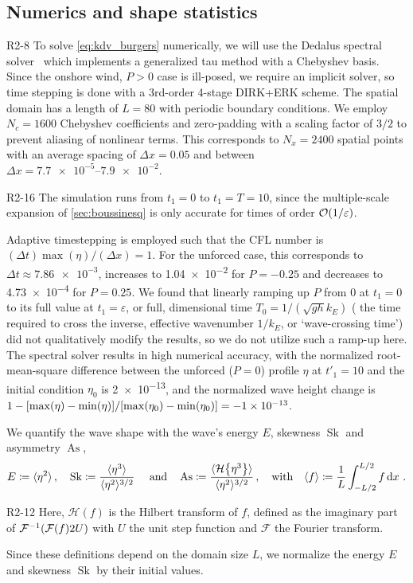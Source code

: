 \documentclass{jfm}
\DeclareMathOperator{\Sk}{Sk}
\DeclareMathOperator{\As}{As}
\newcommand{\fourier}{\mathcal{F}}
\newcommand{\hilbert}{\mathcal{H}}
\renewcommand*{\epsilon}{\varepsilon}
\begin{document}
\subsection{\label{sec:numerics} Numerics and shape statistics}
\begin{LineLabel}{R2-8}
To solve \cref{eq:kdv_burgers} numerically, we will use the Dedalus
spectral solver~\citep{burns2020dedalus} which implements a generalized
tau method with a Chebyshev basis.
Since the onshore wind, $P>0$ case is ill-posed, we require an implicit
solver, so time stepping is done with a 3rd-order 4-stage DIRK+ERK
scheme.
The spatial domain has a length of $L=80$ with periodic boundary
conditions.
We employ $N_c = 1600$ Chebyshev coefficients and zero-padding with a
scaling factor of $3/2$ to prevent aliasing of nonlinear terms.
This corresponds to $N_x = 2400$ spatial points with an average spacing
of $\Delta x = 0.05$ and between $\Delta x = \numrange{7.7e-5}{7.9e-2}$.
\begin{LineLabel}{R2-16}
The simulation runs from $t_1 = 0$ to $t_1 = T = 10$, since the
multiple-scale expansion of \cref{sec:boussinesq} is only accurate for
times of order $\order{1/\epsilon}$.
\end{LineLabel}
Adaptive timestepping is employed such that the CFL number is $(\Delta
t) \max(\eta)/(\Delta x) = 1$.
For the unforced case, this corresponds to $\Delta t \approx
\num{7.86e-3}$, increases to \num{1.04e-2} for $P=-0.25$ and
decreases to \num{4.73e-4} for $P = 0.25$.
We found that linearly ramping up $P$ from $0$ at $t_1=0$ to its full
value at $t_1 = \epsilon$, or full, dimensional time $T_0 = 1/(\sqrt{gh}
k_E)$ (\ie{} the time required to cross the inverse, effective
wavenumber $1/k_E$, or `wave-crossing time') did not qualitatively
modify the results, so we do not utilize such a ramp-up here.
The spectral solver results in high numerical accuracy, with the
normalized root-mean-square difference between the unforced ($P=0$)
profile $\eta$ at $t'_1=10$ and the initial condition $\eta_0$ is
\num{2e-13}, and the normalized wave height change is
$1-\bqty{\max(\eta) - \min(\eta)}/\allowbreak\bqty{\max(\eta_0) -
\min(\eta_0)} = \num{-1e-13}$.
\end{LineLabel}

We quantify the wave shape with the wave's energy $E$, skewness $\Sk$
and asymmetry $\As$,
\begin{equation}
  E \coloneqq \langle \eta^2 \rangle \,, \quad
  \Sk \coloneqq \frac{\langle \eta^3 \rangle}{\langle \eta^2
  \rangle^{3/2}} \
  \qq{and}
  \As \coloneqq \frac{\langle \hilbert \Bqty{\eta^3} \rangle}{\langle
    \eta^2 \rangle^{3/2}}
  \,, \qq{with}
  \langle f \rangle \coloneqq \frac{1}{L} \int_{-L/2}^{L/2} f
  \dd{x} \,.
  \label{eq:shape_stats_def}
\end{equation}
\begin{LineLabel}{R2-12}
Here, $\hilbert(f)$ is the Hilbert transform of $f$, defined as the
imaginary part of $\fourier^{-1} \pqty{ \fourier \pqty{f} 2U}$ with $U$
the unit step function and $\fourier$ the Fourier transform.
\end{LineLabel}
Since these definitions depend on the domain size $L$, we normalize the
energy $E$ and skewness $\Sk$ by their initial values.
\end{document}
